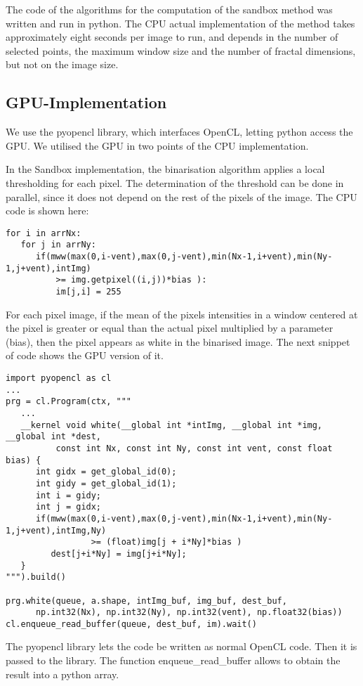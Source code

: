 \documentclass[oneside,a4paper,english,links]{article}
\begin{document}
The code of the algorithms for the computation of the sandbox method was written and run in python. The CPU actual implementation of the method takes approximately eight seconds per image to run, and depends in the number of selected points, the maximum window size and the number of fractal dimensions, but not on the image size.

\subsection{GPU-Implementation}
We use the pyopencl library, which interfaces OpenCL, letting python access the GPU. We utilised the GPU in two points of the CPU implementation.

In the Sandbox implementation, the binarisation algorithm applies a local thresholding for each pixel. The determination of the threshold can be done in parallel, since it does not depend on the rest of the pixels of the image. The CPU code is shown here:

\begin{verbatim}
for i in arrNx:
   for j in arrNy:
      if(mww(max(0,i-vent),max(0,j-vent),min(Nx-1,i+vent),min(Ny-1,j+vent),intImg)
          >= img.getpixel((i,j))*bias ): 
          im[j,i] = 255
\end{verbatim}

For each pixel image, if the mean of the pixels intensities in a window centered at the pixel is greater or equal than the actual pixel multiplied by a parameter (bias), then the pixel appears as white in the binarised image. The next snippet of code shows the GPU version of it.

\begin{verbatim}
import pyopencl as cl
...
prg = cl.Program(ctx, """
   ...
   __kernel void white(__global int *intImg, __global int *img, __global int *dest,
          const int Nx, const int Ny, const int vent, const float bias) {
      int gidx = get_global_id(0);
      int gidy = get_global_id(1);
      int i = gidy;
      int j = gidx;
      if(mww(max(0,i-vent),max(0,j-vent),min(Nx-1,i+vent),min(Ny-1,j+vent),intImg,Ny) 
                 >= (float)img[j + i*Ny]*bias )
         dest[j+i*Ny] = img[j+i*Ny];
   }
""").build()

prg.white(queue, a.shape, intImg_buf, img_buf, dest_buf,
      np.int32(Nx), np.int32(Ny), np.int32(vent), np.float32(bias))
cl.enqueue_read_buffer(queue, dest_buf, im).wait()
\end{verbatim}

The pyopencl library lets the code be written as normal OpenCL code. Then it is passed to the library. The function enqueue\_read\_buffer allows to obtain the result into a python array.
\end{document}
